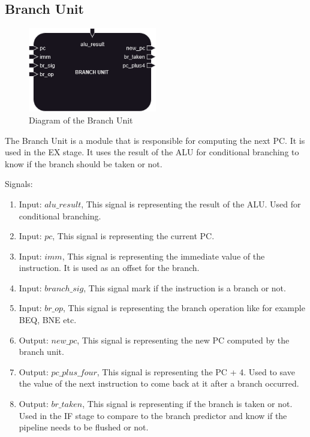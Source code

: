 \subsection{Branch Unit}

\begin{figure}[H]
\centering
\includegraphics[width=0.5\textwidth]{../diagrams/execute/br_unit.png}
\caption{Diagram of the Branch Unit}
\label{fig:br_unit}
\end{figure}

The Branch Unit is a module that is responsible for computing the next PC. It is used in the EX stage. It uses the result of the ALU
for conditional branching to know if the branch should be taken or not.

Signals:
\begin{enumerate}[label={\textbullet}]
    \item Input: $alu\_result$, This signal is representing the result of the ALU. Used for conditional branching.
    \item Input: $pc$, This signal is representing the current PC.
    \item Input: $imm$, This signal is representing the immediate value of the instruction. It is used as an offset for the branch.
    \item Input: $branch\_sig$, This signal mark if the instruction is a branch or not.
    \item Input: $br\_op$, This signal is representing the branch operation like for example BEQ, BNE etc.
    \item Output: $new\_pc$, This signal is representing the new PC computed by the branch unit.
    \item Output: $pc\_plus\_four$, This signal is representing the PC + 4. Used to save the value of the next instruction 
    to come back at it after a branch occurred.
    \item Output: $br\_taken$, This signal is representing if the branch is taken or not. Used in the IF stage to compare 
    to the branch predictor and know if the pipeline needs to be flushed or not.
\end{enumerate}
